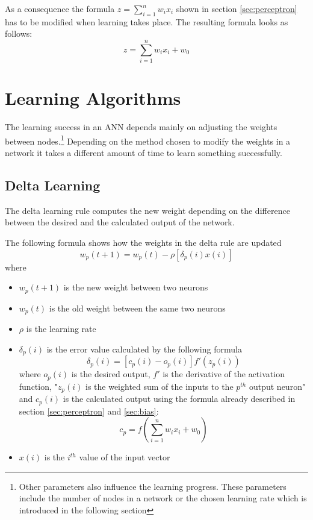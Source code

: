 As a consequence the formula $z = \sum_{i=1}^n w_ix_i$ shown in section \ref{sec:perceptron} has to be modified when learning takes place. The resulting formula looks as follows: \begin{equation} z = \sum_{i=1}^n w_ix_i + w_0 \end{equation}


\section{Learning Algorithms}

The learning success in an ANN depends mainly on adjusting the weights between nodes.\footnote{Other parameters also influence the learning progress. These parameters include the number of nodes in a network or the chosen learning rate which is introduced in the following section} Depending on the method chosen to modify the weights in a network it takes a different amount of time to learn something successfully.

\subsection{Delta Learning}
\label{sec:delta_learning}

The delta learning rule computes the new weight depending on the difference between the desired and the calculated output of the network.

The following formula shows how the weights in the delta rule are updated
\begin{equation} \label{eq:delta_rule} w_p(t+1) =w_p(t) - \rho[\delta_p(i)x(i)] \end{equation}
where
\begin{itemize}
	\addtolength{\itemsep}{-1.5ex}
	\item $w_p(t+1)$ is the new weight between two neurons
	\item $w_p(t)$ is the old weight between the same two neurons
	\item $\rho$ is the learning rate
	\item $\delta_p(i)$ is the error value calculated by the following formula \begin{equation} \delta_p(i) = [c_p(i) - o_p(i)]f'(z_p(i)) \end{equation}
		where $o_p(i)$ is the desired output, $f'$ is the derivative of the activation function, "$z_p(i)$ is the weighted sum of the inputs to the $p^{th}$ output neuron" \cite{pattern} and $c_p(i)$ is the calculated output using the formula already described in section \ref{sec:perceptron} and \ref{sec:bias}: \begin{equation} c_p = f(\sum_{i=1}^n w_ix_i + w_0) \end{equation}
	\item $x(i)$ is the $i^{th}$ value of the input vector
\end{itemize}

